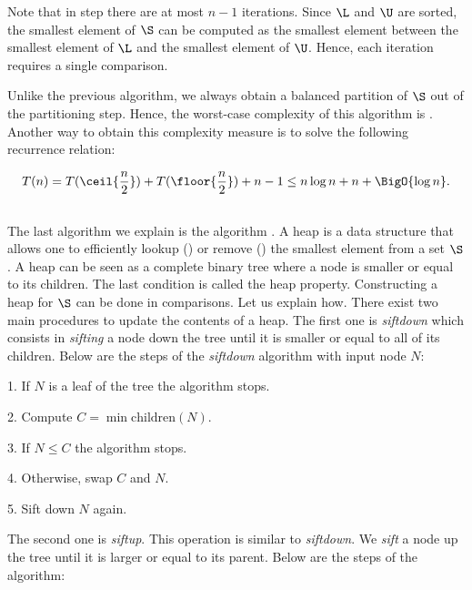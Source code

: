 Note that in step  there are at most \(n - 1\) iterations. Since \(\L\)
and \(\U\) are sorted, the smallest element of \(\S\) can be computed as the
smallest element between the smallest element of \(\L\) and the smallest
element of \(\U\). Hence, each iteration requires a single comparison.

Unlike the previous algorithm, we always obtain a balanced partition of
\(\S\) out of the partitioning step. Hence, the worst-case complexity of this
algorithm is . Another way to obtain this complexity measure
is to solve the following recurrence relation:

\begin{displaymath}
T(n) = T(\ceil{\frac{n}{2}}) + T(\floor{\frac{n}{2}}) + n - 1 \le n \log n +
n + \BigO{\log n}.
\end{displaymath}

\subsection*{\heapsort}

The last algorithm we explain is the \heapsort algorithm
\cite{williams:1964}. A heap is a data structure that allows one to
efficiently lookup () or remove () the smallest element
from a set \(\S\). A heap can be seen as a complete binary tree where a node
is smaller or equal to its children. The last condition is called the heap property.
Constructing a heap for \(\S\) can be done in  comparisons.  Let us
explain how. There exist two main procedures to update the contents of a heap.
The first one is \emph{siftdown} which consists in \emph{sifting} a node down
the tree until it is smaller or equal to all of its children. Below are the
steps of the \emph{siftdown} algorithm with input node \(N\):

\begin{algorithm}
\item[1.] If \(N\) is a leaf of the tree the algorithm stops.
\item[2.] Compute \(C = \min \text{children}(N)\).
\item[3.] If \(N \le C\) the algorithm stops.
\item[4.] Otherwise, swap \(C\) and \(N\).
\item[5.] Sift down \(N\) again.
\end{algorithm}

The second one is \emph{siftup}. This operation is similar to \emph{siftdown}.
We \emph{sift} a node up the tree until it is larger or equal to its parent.
Below are the steps of the algorithm:

